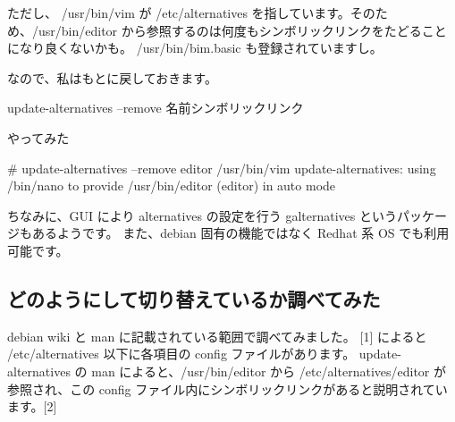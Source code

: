 \documentclass[mingoth,a4paper]{jsarticle}
\begin{document}
ただし、 /usr/bin/vim が /etc/alternatives を指しています。そのため、/usr/bin/editor から参照するのは何度もシンボリックリンクをたどることになり良くないかも。
/usr/bin/bim.basic も登録されていますし。

なので、私はもとに戻しておきます。
\begin{commandline}
update-alternatives --remove ${名前} ${シンボリックリンク}
\end{commandline}

やってみた
\begin{commandline}
# update-alternatives --remove editor /usr/bin/vim
update-alternatives: using /bin/nano to provide /usr/bin/editor (editor) in auto mode
\end{commandline}

ちなみに、GUI により alternatives の設定を行う galternatives というパッケージもあるようです。
また、debian 固有の機能ではなく Redhat 系 OS でも利用可能です。

\subsection{どのようにして切り替えているか調べてみた}

debian wiki と man に記載されている範囲で調べてみました。
%
[1] によると /etc/alternatives 以下に各項目の config ファイルがあります。
update-alternatives の man によると、/usr/bin/editor から /etc/alternatives/editor が参照され、この config ファイル内にシンボリックリンクがあると説明されています。[2]
\end{document}
